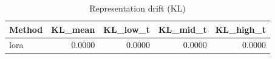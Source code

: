\begin{table}[htbp]
\centering
\caption{Representation drift (KL)}
\label{tab:repr-drift}
\begin{tabular}{lrrrr}
\toprule
\textbf{Method} & \textbf{KL\_mean} & \textbf{KL\_low\_t} & \textbf{KL\_mid\_t} & \textbf{KL\_high\_t} \\
\midrule
lora & 0.0000 & 0.0000 & 0.0000 & 0.0000 \\
\bottomrule
\end{tabular}
\end{table}